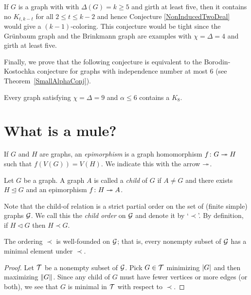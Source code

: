 If $G$ is a graph with with $\Delta(G) = k \geq 5$ and girth at least five, then
it contains no $K_{t, k - t}$ for all $2 \leq t \leq k - 2$ and hence Conjecture \ref{NonInducedTwoDeal} would give a
$(k-1)$-coloring.  This conjecture would be tight since the Gr\"unbaum graph and
the Brinkmann graph are examples with $\chi = \Delta = 4$ and girth at least
five.

Finally, we prove that the following conjecture is equivalent to the
Borodin-Kostochka conjecture for graphs with independence number at most $6$
(see Theorem~\ref{SmallAlphaConj}).

\begin{conjecture}\label{AlphaConjecture}
Every graph satisfying $\chi = \Delta = 9$ and $\alpha \leq 6$ contains a
$K_{8}$.
\end{conjecture}

\section{What is a mule?}
\begin{defn}
If $G$ and $H$ are graphs, an \emph{epimorphism} is a graph homomorphism $f\colon G \twoheadrightarrow H$ such that $f(V(G)) = V(H)$.  We indicate this with the arrow $\twoheadrightarrow$.
\end{defn}

\begin{defn}
Let $G$ be a graph.  A graph $A$ is called a \emph{child} of $G$ if $A \neq G$ and there exists $H \unlhd G$ and an epimorphism $f\colon H \twoheadrightarrow A$.  
\end{defn}

Note that the child-of relation is a strict partial order on the set of (finite simple) graphs $\mathcal{G}$.  
We call this the \emph{child order} on $\mathcal{G}$ and denote it by `$\prec$'.  By definition, if $H \lhd G$ then $H \prec G$.

\begin{lem}\label{well-founded}
The ordering $\prec$ is well-founded on $\mathcal{G}$; that is, every nonempty subset of $\mathcal{G}$ has a minimal element under $\prec$.
\end{lem}
\begin{proof}
Let $\mathcal{T}$ be a nonempty subset of $\mathcal{G}$.  Pick $G \in \mathcal{T}$ minimizing $\left|G\right|$ and then maximizing $\left\Vert G\right\Vert$.  
Since any child of $G$ must have fewer vertices or more edges (or both), we see that $G$ is minimal in $\mathcal{T}$ with respect to $\prec$.
\end{proof}

